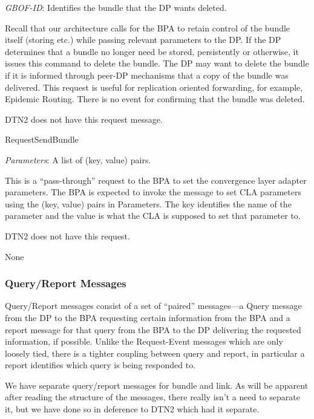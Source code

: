 {
\metP
    {\em GBOF-ID}: Identifies the bundle that the DP wants deleted.

\metD
    Recall that our architecture calls for the BPA to retain control of
    the bundle itself (storing etc.) while passing relevant parameters
    to the DP. If the DP determines that a bundle no longer need be
    stored, persistently or otherwise, it issues this command to delete
    the bundle. The DP may want to delete the bundle if it is informed
    through peer-DP mechanisms that a copy of the bundle was delivered.  
    This request is useful for replication oriented forwarding, for
    example, Epidemic Routing. There is no event for confirming that
    the bundle was deleted. 

\metM
    DTN2 does not have this request message. 

\metR
    RequestSendBundle
}

{
\metP
    {\em Parameters}: A list of (key, value) pairs.

\metD
    This is a ``pass-through'' request to the BPA to set the convergence
    layer adapter parameters. The BPA is expected to invoke the message to
    set CLA parameters using the (key, value) pairs in Parameters. The key
    identifies the name of the parameter and the value is what the 
    CLA is supposed to set that parameter to.

\metM
    DTN2 does not have this request. 

\metR
    None
}

\subsubsection{Query/Report Messages}
\label{sec:DP-QueryReportMessages}

Query/Report messages consist of a set of ``paired'' messages---a Query
message from the DP to the BPA requesting certain information from the BPA and
a report message for that query from the BPA to the DP delivering the
requested information, if possible. Unlike the Request-Event messages which
are only loosely tied, there is a tighter coupling between query and report,
in particular a report identifies which query is being responded to.

We have separate query/report messages for bundle and link. As will be
apparent after reading the structure of the messages, there really isn't
a need to separate it, but we have done so in deference to DTN2 which
had it separate.\\[1em]

